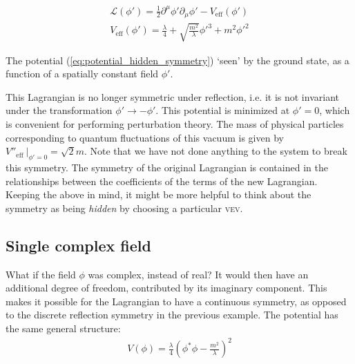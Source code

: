 \begin{align}
\mathcal{L}(\phi') = \frac{1}{2}\partial^\mu\phi'\partial_\mu\phi' - V_\text{eff}(\phi')\\
V_\text{eff}(\phi') = \frac{\lambda}{4} + \sqrt{\frac{m^2}{\lambda}}\phi'^3 + m^2\phi'^2
\label{eq:potential_hidden_symmetry}
\end{align}
\begin{marginfigure}
\caption{The potential (\eqref{eq:potential_hidden_symmetry}) `seen' by the ground state, as a function of a spatially constant field $\phi'$.}
\label{fig:hidden_symmetry}
\end{marginfigure}

This Lagrangian is no longer symmetric under reflection, i.e. it is not invariant under the transformation $\phi'\rightarrow -\phi'$. This potential is minimized at $\phi' = 0$, which is convenient for performing perturbation theory. The mass of physical particles corresponding to quantum fluctuations of this vacuum is given by $V''_\text{eff}~|_{\phi' = 0} = \sqrt{2}m$. Note that we have not done anything to the system to break this symmetry. The symmetry of the original Lagrangian is contained in the relationships between the coefficients of the terms of the new Lagrangian. Keeping the above in mind, it might be more helpful to think about the symmetry as being \emph{hidden} by choosing a particular \textsc{vev}.


\subsection{Single complex field}

What if the field $\phi$ was complex, instead of real? It would then have an additional degree of freedom, contributed by its imaginary component. This makes it possible for the Lagrangian to have a continuous symmetry, as opposed to the discrete reflection symmetry in the previous example. The potential has the same general structure:
\begin{align}
V(\phi) = \frac{\lambda}{4}\left(\phi^{*}\phi - \frac{m^2}{\lambda}\right)^2
\label{eq:single_complex_field_potential}
\end{align}

